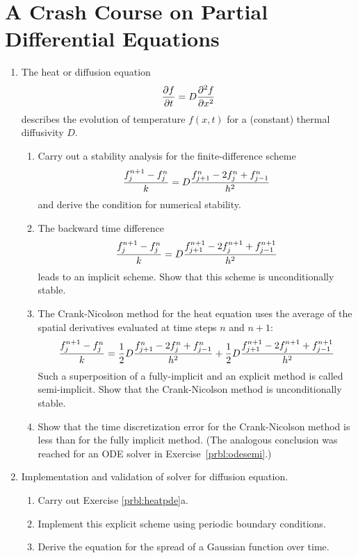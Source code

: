 \documentclass{article}
\begin{document}
\section{A Crash Course on Partial Differential Equations}
\begin{enumerate}
\item The heat or diffusion equation \label{prbl:heatpde} 
\[
{\partial f \over \partial t} = D {\partial^2 f\over\partial x^2}
\]
describes the evolution of temperature $f(x,t)$ for a (constant) thermal diffusivity $D$.
\begin{enumerate}\setlength{\itemsep}{0pt}
\item 
Carry out a stability analysis for the finite-difference scheme
\[
{ f^{n+1}_j - f^n_j \over k } = D { f^n_{j+1} - 2 f^n_j + f^n_{j-1} \over h^2 }
\]
and derive the condition for numerical stability.
\item
The backward time difference
\[
{ f^{n+1}_j - f^n_j \over k } = D { f^{n+1}_{j+1} - 2 f^{n+1}_j + f^{n+1}_{j-1} \over h^2 }
\]
leads to an implicit scheme.
Show that this scheme is unconditionally stable.

\item The Crank-Nicolson method for the heat equation uses the average of the spatial derivatives evaluated at time steps $n$ and $n+1$:
\[
{ f^{n+1}_j - f^n_j \over k } = 
\frac{1}{2} D { f^{n}_{j+1} - 2 f^{n}_j + f^{n}_{j-1} \over h^2 } + 
\frac{1}{2} D { f^{n+1}_{j+1} - 2 f^{n+1}_j + f^{n+1}_{j-1} \over h^2 }
\]
Such a superposition of a fully-implicit and an explicit method is called semi-implicit.
Show that the Crank-Nicolson method is unconditionally stable.

\item Show that the time discretization error for the Crank-Nicolson method is less than for the fully implicit method. (The analogous conclusion was reached for an ODE solver in Exercise~\ref{prbl:odesemi}.)
\end{enumerate}


\item Implementation and validation of solver for diffusion equation.
\begin{enumerate}\setlength{\itemsep}{0pt}
\item Carry out Exercise \ref{prbl:heatpde}a.
  
\item Implement this explicit scheme using periodic boundary conditions.

\item 
  Derive the equation for the spread of a Gaussian function over time.
  

\end{enumerate}
\end{enumerate}
\end{document}
